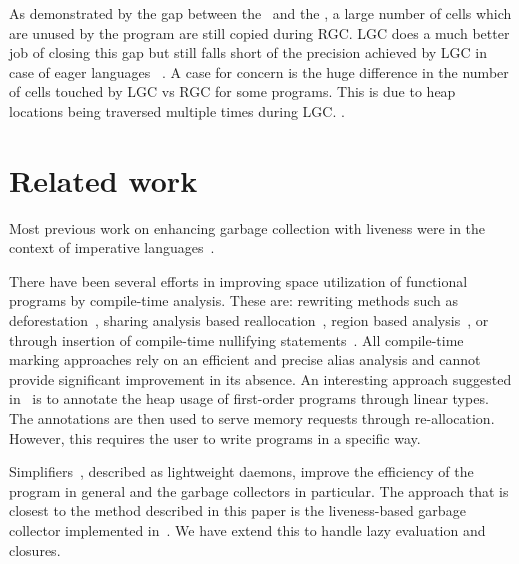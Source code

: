 \documentclass[preprint, 9pt]{sigplanconf}
\newcommand{\warning}[1]{{\color{Myred}{#1}}}
\begin{document}
As demonstrated by the gap between the \RGCLine\ and the \UseLine, a large number of cells 
which are unused by the program are still copied during RGC. LGC does a much better job of closing this gap 
but still falls short of the precision achieved by LGC in case of eager languages
~\cite{asati14lgc}. 
A case for concern is the huge difference in the number of cells touched by LGC vs RGC for some programs.
This is due to heap locations being  traversed multiple times during LGC. \warning{We have implemented heuristics to 
overcome common cases and they show promising results}.



\section{Related work} 
\label{sec:relatedwork}

Most previous work on enhancing  garbage collection with liveness were
in   the  context   of   imperative  languages~\cite{Albert,   Hirzel,
  khedker07heap}.    \warning{Due  to  the  presence  of  global  variables  and
mutation, these methods are of  limited practical  utility.}

There  have been  several efforts  in improving  space utilization  of
functional programs  by compile-time  analysis.  These  are: rewriting
methods                             such                            as
deforestation~\cite{wadler88deforest,gill93ashort,chitil99deforest},
sharing  analysis   based  reallocation~\cite{jones89compile},  region
based   analysis~\cite{tofte98region},   or   through   insertion   of
compile-time                                                nullifying
statements~\cite{inoue88analysis,lee05static,Hamilton}.            All
compile-time marking approaches rely on an efficient and precise alias
analysis and  cannot provide  significant improvement in  its absence.
An interesting  approach suggested in~\cite{HofmannJ03}  is to
annotate the heap usage of  first-order programs through linear types.
The annotations are then used to serve memory
requests through re-allocation.  However, this
requires the user to write programs in a specific way.

Simplifiers~\cite{ONeill}, described  as lightweight  daemons, improve
the efficiency of the program in general and the garbage collectors in
particular.  \warning{Most  of the  simplifications mentioned  in this
  work are subsumed by a liveness  based collector.  We feel this work
  is orthogonal  and can augment  our liveness based  collector.}  The
approach that is closest to the  method described in this paper is the
liveness-based garbage collector implemented in~\cite{karkare07liveness,asati14lgc}.  We
have extend this to handle lazy evaluation and closures.
 
\end{document}
